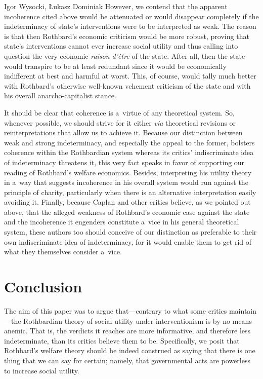 \begin{artengenv}{Igor Wysocki, Łukasz Dominiak}
However, we contend that the apparent incoherence cited above would be attenuated or would disappear completely if the indeterminacy of state's interventions were to be interpreted as weak. The reason is that then Rothbard's economic criticism would be more robust, proving that state's interventions cannot ever increase social utility and thus calling into question the very economic \textit{raison d'être} of the state. After all, then the state would transpire to be at least redundant since it would be economically indifferent at best and harmful at worst. This, of course, would tally much better with Rothbard's otherwise well-known vehement criticism of the state and with his overall anarcho-capitalist stance.



It should be clear that coherence is a~virtue of any theoretical system. So, whenever possible, we should strive for it either \textit{via} theoretical revisions or reinterpretations that allow us to achieve it. Because our distinction between weak and strong indeterminacy, and especially the appeal to the former, bolsters coherence within the Rothbardian system whereas its critics' indiscriminate idea of indeterminacy threatens it, this very fact speaks in favor of supporting our reading of Rothbard's welfare economics. Besides, interpreting his utility theory in a~way that suggests incoherence in his overall system would run against the principle of charity, particularly when there is an alternative interpretation easily avoiding it. Finally, because Caplan and other critics believe, as we pointed out above, that the alleged weakness of Rothbard's economic case against the state and the incoherence it engenders constitute a~vice in his general theoretical system, these authors too should conceive of our distinction as preferable to their own indiscriminate idea of indeterminacy, for it would enable them to get rid of what they themselves consider a~vice.



\section{Conclusion}

The aim of this paper was to argue that---contrary to what some critics maintain---the Rothbardian theory of social utility under interventionism is by no means anemic. That is, the verdicts it reaches are more informative, and therefore less indeterminate, than its critics believe them to be. Specifically, we posit that Rothbard's welfare theory should be indeed construed as saying that there is one thing that we can say for certain; namely, that governmental acts are powerless to increase social utility.




\end{artengenv}
